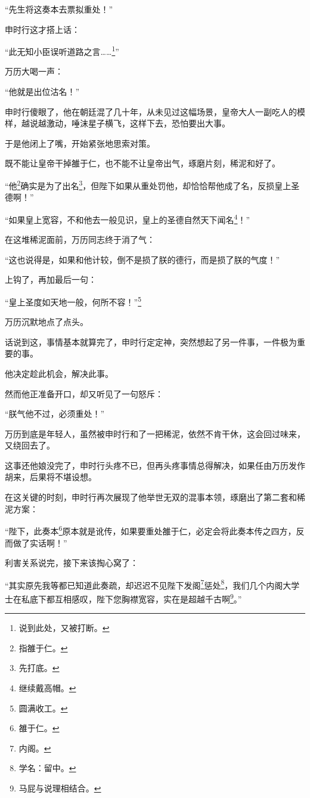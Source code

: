 \begin{multicols}{\theparacolNo}
		“先生将这奏本去票拟重处！”

		申时行这才搭上话：

		“此无知小臣误听道路之言……\footnote{说到此处，又被打断。}”

		万历大喝一声：

		“他就是出位沽名！”

		申时行傻眼了，他在朝廷混了几十年，从未见过这幅场景，皇帝大人一副吃人的模样，越说越激动，唾沫星子横飞，这样下去，恐怕要出大事。

		于是他闭上了嘴，开始紧张地思索对策。

		既不能让皇帝干掉雒于仁，也不能不让皇帝出气，琢磨片刻，稀泥和好了。

		“他\footnote{指雒于仁。}确实是为了出名\footnote{先打底。}，但陛下如果从重处罚他，却恰恰帮他成了名，反损皇上圣德啊！”

		“如果皇上宽容，不和他去一般见识，皇上的圣德自然天下闻名\footnote{继续戴高帽。}！”

		在这堆稀泥面前，万历同志终于消了气：

		“这也说得是，如果和他计较，倒不是损了朕的德行，而是损了朕的气度！”

		上钩了，再加最后一句：

		“皇上圣度如天地一般，何所不容！”\footnote{圆满收工。}

		万历沉默地点了点头。

		话说到这，事情基本就算完了，申时行定定神，突然想起了另一件事，一件极为重要的事。

		他决定趁此机会，解决此事。

		然而他正准备开口，却又听见了一句怒斥：

		“朕气他不过，必须重处！”

		万历到底是年轻人，虽然被申时行和了一把稀泥，依然不肯干休，这会回过味来，又绕回去了。

		这事还他娘没完了，申时行头疼不已，但再头疼事情总得解决，如果任由万历发作胡来，后果将不堪设想。

		在这关键的时刻，申时行再次展现了他举世无双的混事本领，琢磨出了第二套和稀泥方案：

		“陛下，此奏本\footnote{雒于仁。}原本就是讹传，如果要重处雒于仁，必定会将此奏本传之四方，反而做了实话啊！”

		利害关系说完，接下来该掏心窝了：

		“其实原先我等都已知道此奏疏，却迟迟不见陛下发阁\footnote{内阁。}惩处\footnote{学名：留中。}，我们几个内阁大学士在私底下都互相感叹，陛下您胸襟宽容，实在是超越千古啊\footnote{马屁与说理相结合。}。”


\end{multicols}
